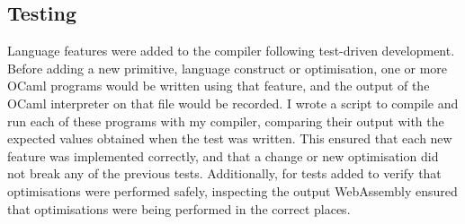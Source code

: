 

\subsection{Testing}
Language features were added to the compiler following test-driven development. Before adding a new primitive, language construct or optimisation, one or more OCaml programs would be written using that feature, and the output of the OCaml interpreter on that file would be recorded. 
I wrote a script to compile and run each of these programs with my compiler, comparing their output with the expected values obtained when the test was written. This ensured that each new feature was implemented correctly, and that a change or new optimisation did not break any of the previous tests. %
Additionally, for tests added to verify that optimisations were performed safely, inspecting the output WebAssembly ensured that optimisations were being performed in the correct places. 


